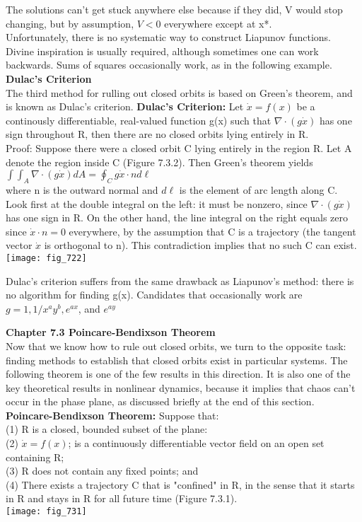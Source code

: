 \documentclass{article}
\newcommand\tab[1][1cm]{\hspace*{#1}}
\begin{document}
The solutions can't get stuck anywhere else because if they did, V would stop changing, but by assumption, $V<0$ everywhere except at x*. \\ \tab
Unfortunately, there is no systematic way to construct Liapunov functions. Divine inspiration is usually required, although sometimes one can work backwards. Sums of squares occasionally work, as in the following example. \\ \tab
\textbf{Dulac's Criterion} \\ \tab
The third method for rulling out closed orbits is based on Green's theorem, and is known as Dulac's criterion. 
\textbf {Dulac's Criterion:} Let $\dot{x}=f(x)$ be a continously differentiable, real-valued function g(x) such that $\nabla \cdot (g\dot{x})$ has one sign throughout R, then there are no closed orbits lying entirely in R. \\ \tab
Proof: Suppose there were a closed orbit C lying entirely in the region R. Let A denote the region inside C (Figure 7.3.2). Then Green's theorem yields \\ \tab
$\int \int_{A} \nabla \cdot (g\dot{x})dA = \oint_{C} g \dot{x} \cdot n d \ell$ \\

where n is the outward normal and $d\ell$ is the element of arc length along C. Look first at the double integral on the left: it must be nonzero, since $\nabla \cdot (g\dot{x})$ has one sign in R. On the other hand, the line integral on the right equals zero since $\dot{x}\cdot n = 0$ everywhere, by the assumption that C is a trajectory (the tangent vector $\dot{x}$ is orthogonal to n). This contradiction implies that no such C can exist.
\\
\texttt{[image: fig\_722]}

Dulac's criterion suffers from the same drawback as Liapunov's method: there is no algorithm for finding g(x). Candidates that occasionally work are $g=1, 1/x^{a}y^{b}, e^{ax}$, and $e^{ay}$


\textbf {Chapter 7.3 Poincare-Bendixson Theorem} \\
Now that we know how to rule out closed orbits, we turn to the opposite task: finding methods to establish that closed orbits exist in particular systems. The following theorem is one of the few results in this direction. It is also one of the key theoretical results in nonlinear dynamics, because it implies that chaos can't occur in the phase plane, as discussed briefly at the end of this section. \\ 
\textbf {Poincare-Bendixson Theorem:} Suppose that: \\ (1) R is a closed, bounded subset of the plane: \\ 
(2) $\dot{x}=f(x)$; is a continuously differentiable vector field on an open set containing R; \\
(3) R does not contain any fixed points; and \\ 
(4) There exists a trajectory C that is "confined" in R, in the sense that it starts in R and stays in R for all future time (Figure 7.3.1). \\
\texttt{[image: fig\_731]}
\end{document}
